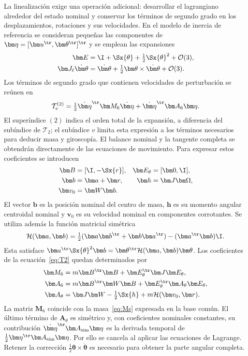 La linealización exige una operación adicional: desarrollar el lagrangiano alrededor del estado nominal y conservar los términos de segundo grado en los desplazamientos, rotaciones y sus velocidades. En el modelo de inercia de referencia se consideran pequeñas las componentes de $\bm\eta=[\bm u^\tr,\bm\theta^\tr]^\tr$ y se emplean las expansiones
\begin{align}
\bm E&=\I+\Sx{\theta}+\tfrac12\Sx{\theta}^2+\mathcal O(3),\nonumber\\
\bm J_\ell\dot{\bm\theta}&=\dot{\bm\theta}
+\tfrac12\bm\theta\times\dot{\bm\theta}+\mathcal O(3).
\end{align}
Los términos de segundo grado que contienen velocidades de perturbación se reúnen en
\begin{equation}
\mathcal T_v^{(2)}=\tfrac12\dot{\bm\eta}^\tr\bm M_6\dot{\bm\eta}
+\dot{\bm\eta}^\tr\bm A_6\bm\eta.
\label{eq:T2}
\end{equation}
El superíndice $(2)$ indica el orden total de la expansión, a diferencia del subíndice de $\mathcal T_2$; el subíndice $v$ limita esta expresión a los términos necesarios para deducir masa y giroscopía. El balance nominal y la tangente completa se obtendrán directamente de las ecuaciones de movimiento. Para expresar estos coeficientes se introducen
\begin{align}
\bm B&=[\I,-\Sx{r}],&\bm E_\theta&=[\bm0,\I],\nonumber\\
\bm b&=\bm a+\bm r,&\bm h&=\bm J\bm\Omega,\nonumber\\
\bm v_0&=\bm W\bm b.
\end{align}
El vector $\bm b$ es la posición nominal del centro de masa, $\bm h$ es su momento angular centroidal nominal y $\bm v_0$ es su velocidad nominal en componentes corrotantes. Se utiliza además la función matricial simétrica
\begin{equation}
\mathcal H(\bm a,\bm b)=\tfrac12(\bm a\bm b^\tr+\bm b\bm a^\tr)
-(\bm a^\tr\bm b)\I.
\end{equation}
Esta satisface $\bm a^\tr\Sx{\theta}^2\bm b=\bm\theta^\tr\mathcal H(\bm a,\bm b)\bm\theta$. Los coeficientes de la ecuación~\eqref{eq:T2} quedan determinados por
\begin{align}
\bm M_6&=m\bm B^\tr\bm B+\bm E_\theta^\tr\bm J\bm E_\theta,\label{eq:M6}\\
\bm A_6&=m\bm B^\tr\bm W\bm B+\bm E_\theta^\tr\bm A_\theta\bm E_\theta,\nonumber\\
\bm A_\theta&=\bm J\bm W-\tfrac12\Sx{h}+m\mathcal H(\bm v_0,\bm r).
\label{eq:A6}
\end{align}
La matriz $\bm M_6$ coincide con la masa~\eqref{eq:Ms} expresada en la base común. El último término de $\bm A_\theta$ es simétrico y, con coeficientes nominales constantes, su contribución $\dot{\bm\eta}^\tr\bm A_{\rm sim}\bm\eta$ es la derivada temporal de $\tfrac12\bm\eta^\tr\bm A_{\rm sim}\bm\eta$. Por ello se cancela al aplicar las ecuaciones de Lagrange. Retener la corrección $\tfrac12\bm\theta\times\dot{\bm\theta}$ es necesario para obtener la parte angular completa.

